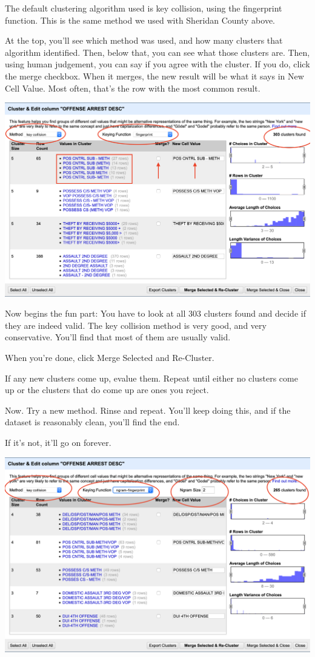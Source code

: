 \documentclass[]{book}
\begin{document}
The default clustering algorithm used is key collision, using the fingerprint function. This is the same method we used with Sheridan County above.

At the top, you'll see which method was used, and how many clusters that algorithm identified. Then, below that, you can see what those clusters are. Then, using human judgement, you can say if you agree with the cluster. If you do, click the merge checkbox. When it merges, the new result will be what it says in New Cell Value. Most often, that's the row with the most common result.

\includegraphics[width=27.78in]{images/open6}

Now begins the fun part: You have to look at all 303 clusters found and decide if they are indeed valid. The key collision method is very good, and very conservative. You'll find that most of them are usually valid.

When you're done, click Merge Selected and Re-Cluster.

If any new clusters come up, evalue them. Repeat until either no clusters come up or the clusters that do come up are ones you reject.

Now. Try a new method. Rinse and repeat. You'll keep doing this, and if the dataset is reasonably clean, you'll find the end.

If it's not, it'll go on forever.

\includegraphics[width=27.75in]{images/open7}
\end{document}
